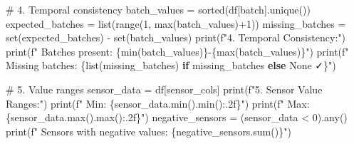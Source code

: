 \documentclass[
  letterpaper,
  DIV=11,
  numbers=noendperiod]{scrartcl}
\newenvironment{Shaded}{\begin{snugshade}}{\end{snugshade}}
\newcommand{\BuiltInTok}[1]{\textcolor[rgb]{0.00,0.23,0.31}{#1}}
\newcommand{\CommentTok}[1]{\textcolor[rgb]{0.37,0.37,0.37}{#1}}
\newcommand{\ControlFlowTok}[1]{\textcolor[rgb]{0.00,0.23,0.31}{\textbf{#1}}}
\newcommand{\DecValTok}[1]{\textcolor[rgb]{0.68,0.00,0.00}{#1}}
\newcommand{\NormalTok}[1]{\textcolor[rgb]{0.00,0.23,0.31}{#1}}
\newcommand{\OperatorTok}[1]{\textcolor[rgb]{0.37,0.37,0.37}{#1}}
\newcommand{\SpecialCharTok}[1]{\textcolor[rgb]{0.37,0.37,0.37}{#1}}
\newcommand{\SpecialStringTok}[1]{\textcolor[rgb]{0.13,0.47,0.30}{#1}}
\newcommand{\StringTok}[1]{\textcolor[rgb]{0.13,0.47,0.30}{#1}}
\renewenvironment{Shaded}{%
  \begin{tcolorbox}[%
    enhanced,%
    colback=codebg,%
    colframe=codebg,%
    borderline west={3pt}{0pt}{sectionblue},%
    fontupper=\small\ttfamily,%
    boxrule=0pt,%
    arc=0pt,%
    boxsep=5pt,%
    left=2mm,%
    right=2mm,%
    top=2mm,%
    bottom=2mm%
  ]%
}{%
  \end{tcolorbox}%
}
\begin{document}
\begin{Shaded}
\begin{Highlighting}[]
\CommentTok{\# 4. Temporal consistency}
\NormalTok{batch\_values }\OperatorTok{=} \BuiltInTok{sorted}\NormalTok{(df[}\StringTok{\textquotesingle{}batch\textquotesingle{}}\NormalTok{].unique())}
\NormalTok{expected\_batches }\OperatorTok{=} \BuiltInTok{list}\NormalTok{(}\BuiltInTok{range}\NormalTok{(}\DecValTok{1}\NormalTok{, }\BuiltInTok{max}\NormalTok{(batch\_values)}\OperatorTok{+}\DecValTok{1}\NormalTok{))}
\NormalTok{missing\_batches }\OperatorTok{=} \BuiltInTok{set}\NormalTok{(expected\_batches) }\OperatorTok{{-}} \BuiltInTok{set}\NormalTok{(batch\_values)}
\BuiltInTok{print}\NormalTok{(}\SpecialStringTok{f"4. Temporal Consistency:"}\NormalTok{)}
\BuiltInTok{print}\NormalTok{(}\SpecialStringTok{f"   Batches present: }\SpecialCharTok{\{}\BuiltInTok{min}\NormalTok{(batch\_values)}\SpecialCharTok{\}}\SpecialStringTok{{-}}\SpecialCharTok{\{}\BuiltInTok{max}\NormalTok{(batch\_values)}\SpecialCharTok{\}}\SpecialStringTok{"}\NormalTok{)}
\BuiltInTok{print}\NormalTok{(}\SpecialStringTok{f"   Missing batches: }\SpecialCharTok{\{}\BuiltInTok{list}\NormalTok{(missing\_batches) }\ControlFlowTok{if}\NormalTok{ missing\_batches }\ControlFlowTok{else} \StringTok{\textquotesingle{}None ✓\textquotesingle{}}\SpecialCharTok{\}}\SpecialStringTok{"}\NormalTok{)}

\CommentTok{\# 5. Value ranges}
\NormalTok{sensor\_data }\OperatorTok{=}\NormalTok{ df[sensor\_cols]}
\BuiltInTok{print}\NormalTok{(}\SpecialStringTok{f"5. Sensor Value Ranges:"}\NormalTok{)}
\BuiltInTok{print}\NormalTok{(}\SpecialStringTok{f"   Min: }\SpecialCharTok{\{}\NormalTok{sensor\_data}\SpecialCharTok{.}\BuiltInTok{min}\NormalTok{()}\SpecialCharTok{.}\BuiltInTok{min}\NormalTok{()}\SpecialCharTok{:.2f\}}\SpecialStringTok{"}\NormalTok{)}
\BuiltInTok{print}\NormalTok{(}\SpecialStringTok{f"   Max: }\SpecialCharTok{\{}\NormalTok{sensor\_data}\SpecialCharTok{.}\BuiltInTok{max}\NormalTok{()}\SpecialCharTok{.}\BuiltInTok{max}\NormalTok{()}\SpecialCharTok{:.2f\}}\SpecialStringTok{"}\NormalTok{)}
\NormalTok{negative\_sensors }\OperatorTok{=}\NormalTok{ (sensor\_data }\OperatorTok{\textless{}} \DecValTok{0}\NormalTok{).}\BuiltInTok{any}\NormalTok{()}
\BuiltInTok{print}\NormalTok{(}\SpecialStringTok{f"   Sensors with negative values: }\SpecialCharTok{\{}\NormalTok{negative\_sensors}\SpecialCharTok{.}\BuiltInTok{sum}\NormalTok{()}\SpecialCharTok{\}}\SpecialStringTok{"}\NormalTok{)}


\end{Highlighting}
\end{Shaded}
\end{document}
